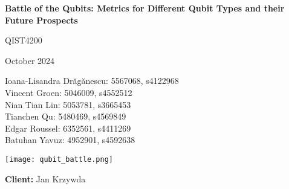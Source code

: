 \begin{titlepage}
    \begin{center}
        \vspace*{1cm}
        \huge \textbf{Battle of the Qubits: Metrics for Different Qubit Types and their Future Prospects}
        
        \vspace{0.15cm}
        
        \Large QIST4200

        \vspace{0.2cm}
        
        \normalsize October 2024
        \vspace{1.5cm}

        Ioana-Lisandra Drăgănescu: 5567068, s4122968\\
        Vincent Groen: 5046009, s4552512\\
        Nian Tian Lin: 5053781, s3665453\\
        Tianchen Qu: 5480469, s4569849\\
        Edgar Roussel: 6352561, s4411269\\
        Batuhan Yavuz: 4952901, s4592638\\
        
        \vspace{1.0cm}
        
        \texttt{[image: qubit\_battle.png]}

        \vspace{0.5cm}
        \textbf{Client: } Jan Krzywda\\
    \end{center}
\end{titlepage}
\restoregeometry
